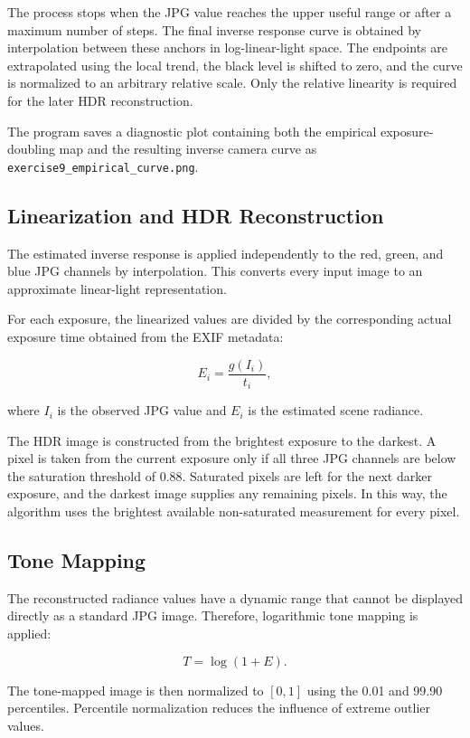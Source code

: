 \documentclass[11pt,a4paper]{article}
\begin{document}
The process stops when the JPG value reaches the upper useful range or after a maximum number of steps. The final inverse response curve is obtained by interpolation between these anchors in log-linear-light space. The endpoints are extrapolated using the local trend, the black level is shifted to zero, and the curve is normalized to an arbitrary relative scale. Only the relative linearity is required for the later HDR reconstruction.

The program saves a diagnostic plot containing both the empirical exposure-doubling map and the resulting inverse camera curve as \texttt{exercise9\_empirical\_curve.png}.

\subsection{Linearization and HDR Reconstruction}

The estimated inverse response is applied independently to the red, green, and blue JPG channels by interpolation. This converts every input image to an approximate linear-light representation.

For each exposure, the linearized values are divided by the corresponding actual exposure time obtained from the EXIF metadata:

\[
E_i = \frac{g(I_i)}{t_i},
\]

where $I_i$ is the observed JPG value and $E_i$ is the estimated scene radiance.

The HDR image is constructed from the brightest exposure to the darkest. A pixel is taken from the current exposure only if all three JPG channels are below the saturation threshold of 0.88. Saturated pixels are left for the next darker exposure, and the darkest image supplies any remaining pixels. In this way, the algorithm uses the brightest available non-saturated measurement for every pixel.

\subsection{Tone Mapping}

The reconstructed radiance values have a dynamic range that cannot be displayed directly as a standard JPG image. Therefore, logarithmic tone mapping is applied:

\[
T = \log(1+E).
\]

The tone-mapped image is then normalized to $[0,1]$ using the 0.01 and 99.90 percentiles. Percentile normalization reduces the influence of extreme outlier values.
\end{document}
